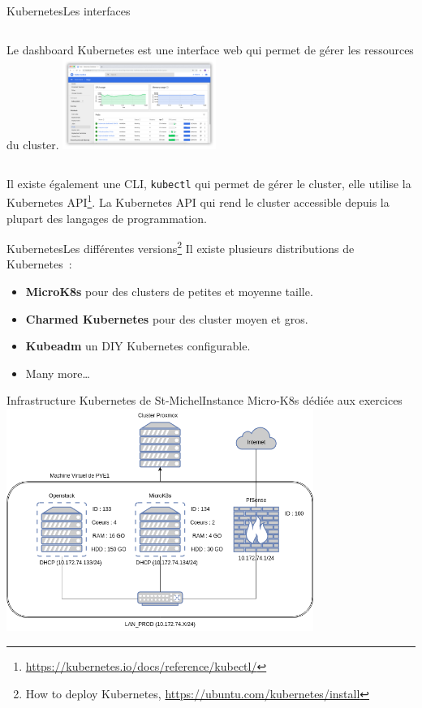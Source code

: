 \documentclass{beamer}
\begin{document}
    \begin{frame}{Kubernetes}{Les interfaces}
        \begin{columns}
            Le dashboard Kubernetes est une interface web qui permet de gérer les ressources du cluster\footnotemark.
            \centering
            \includegraphics[width=5cm]{image/kubernetes-dashboard}
        \end{columns}
        \flushleft
        \bigbreak
        Il existe également une CLI, \lstinline{kubectl} qui permet de gérer le cluster, elle utilise la Kubernetes API\footnote{\url{https://kubernetes.io/docs/reference/kubectl/}}.
        \bigbreak
        La Kubernetes API qui rend le cluster accessible depuis la plupart des langages de programmation.
    \end{frame}

    \begin{frame}{Kubernetes}{Les différentes versions\footnote{How to deploy Kubernetes, \url{https://ubuntu.com/kubernetes/install}}}
        Il existe plusieurs distributions de Kubernetes~:
        \begin{itemize}
            \item \textbf{MicroK8s} pour des clusters de petites et moyenne taille.
            \item \textbf{Charmed Kubernetes} pour des cluster moyen et gros.
            \item \textbf{Kubeadm} un DIY Kubernetes configurable.
            \item Many more\ldots
        \end{itemize}
    \end{frame}

    \begin{frame}{Infrastructure Kubernetes de St-Michel}{Instance Micro-K8s dédiée aux exercices}
        \bigbreak
        \centering
        \includegraphics[width=10cm]{image/infra.drawio}
    \end{frame}
\end{document}
